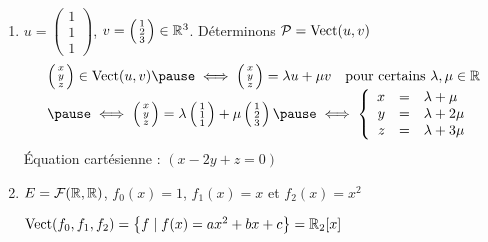 \begin{frame}
\begin{enumerate}
  \item $u = \left(\begin{smallmatrix}1 \\ 1 \\ 1 \end{smallmatrix}\right)$,
  $v = \left(\begin{smallmatrix}1 \\ 2 \\ 3 \end{smallmatrix}\right) \in \mathbb{R}^3$.  
  Déterminons $\mathcal{P} = \mathop{\text{Vect}}\nolimits (u,v)$ 
  \pause
$$ \begin{array}{l}
 \left(\begin{smallmatrix}x \\ y \\ z \end{smallmatrix}\right) \in \Vect (u,v)
 \pause
 \iff  \left(\begin{smallmatrix}x \\ y \\ z \end{smallmatrix}\right) 
 = \lambda u + \mu v  \quad \text{pour certains $\lambda,\mu \in \Rr$} \\
  \pause
  \iff  \left(\begin{smallmatrix}x \\ y \\ z \end{smallmatrix}\right) = 
 \lambda\left(\begin{smallmatrix}1 \\ 1 \\ 1 \end{smallmatrix}\right) + \mu \left(\begin{smallmatrix}1 \\ 2 \\ 3 \end{smallmatrix}\right)
  \pause
  \iff  
 \left\{
 \begin{array}{rcl}
   x & = & \lambda + \mu \\
   y & = & \lambda + 2 \mu \\
   z & = & \lambda + 3 \mu \\
 \end{array}\right. \\
 \end{array} $$
 \pause
\'Equation cartésienne : $(x-2y+z=0)$

  \pause
 
\item $E = \mathcal{F}(\mathbb{R},\mathbb{R})$, $f_0(x)=1$, $f_1(x)=x$ et $f_2(x)=x^2$

 \pause
$\mathop{\text{Vect}}\nolimits (f_0, f_1, f_2) =\big\{ f \mid f(x) = ax^2+bx+c \big\} = \mathbb{R}_2[x]$

\end{enumerate}

\end{frame}



